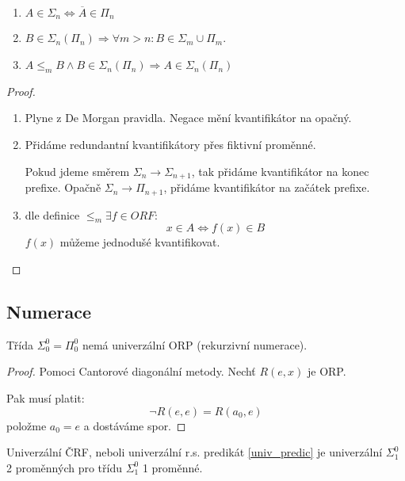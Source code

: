 \begin{theorem}\label{aritm_hier_prop}
	\begin{enumerate}
		\item $A \in \Sigma_n \iff \overline{A} \in \Pi_n$
		\item $B \in \Sigma_n (\Pi_n) \Rightarrow \forall m > n: B \in \Sigma_m \cup \Pi_m$.
		\item $A \leq_m B \land B \in \Sigma_n(\Pi_n) \Rightarrow A \in \Sigma_n(\Pi_n)$
	\end{enumerate}
\end{theorem}
\begin{proof}
	\begin{enumerate}
		\item Plyne z De Morgan pravidla. Negace mění kvantifikátor na opačný.
		\item Přidáme redundantní kvantifikátory přes fiktivní proměnné.

			Pokud jdeme směrem $\Sigma_n \to \Sigma_{n + 1}$, tak přidáme kvantifikátor na konec prefixe.
			Opačně $\Sigma_n \to \Pi_{n + 1}$, přidáme kvantifikátor na začátek prefixe.
		\item dle definice $\leq_m \exists f \in ORF$:
			\[ x \in A \iff f(x) \in B \]
			$f(x)$ můžeme jednodušé kvantifikovat.
	\end{enumerate}
\end{proof}

\subsection{Numerace}

\begin{theorem}
	Třída $\Sigma_0^0 = \Pi_0^0$ nemá univerzální ORP (rekurzivní numerace).
\end{theorem}
\begin{proof}
	Pomoci Cantorové diagonální metody.
	Nechť $R(e, x)$ je ORP.

	Pak musí platit:
	\[ \neg R(e, e) = R(a_0, e) \]
	položme $a_0 = e$ a dostáváme spor.
\end{proof}

\begin{note}
	Univerzální ČRF, neboli univerzální r.s. predikát \cref{univ_predic} je univerzální $\Sigma_1^0$ 2 proměnných pro třídu $\Sigma_1^0$ 1 proměnné.
\end{note}

